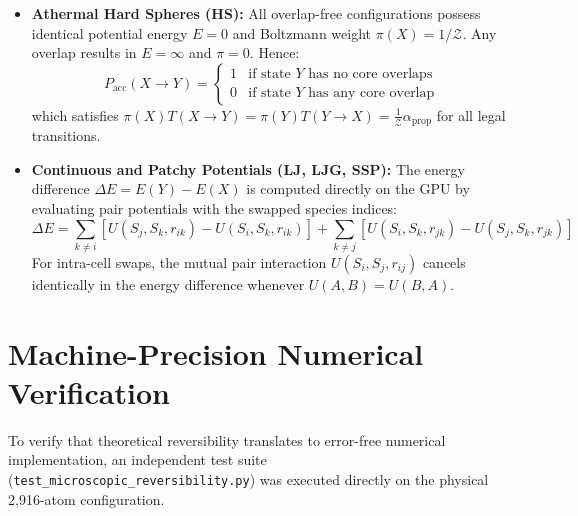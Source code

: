 \documentclass[11pt,a4paper]{article}
\begin{document}
\begin{itemize}
    \item \textbf{Athermal Hard Spheres (HS):} All overlap-free configurations possess identical potential energy $E = 0$ and Boltzmann weight $\pi(X) = 1/\mathcal{Z}$. Any overlap results in $E = \infty$ and $\pi = 0$. Hence:
    \begin{equation}
        P_{\text{acc}}(X \to Y) = \begin{cases} 1 & \text{if state } Y \text{ has no core overlaps} \\ 0 & \text{if state } Y \text{ has any core overlap} \end{cases}
    \end{equation}
    which satisfies $\pi(X) T(X \to Y) = \pi(Y) T(Y \to X) = \frac{1}{\mathcal{Z}} \alpha_{\text{prop}}$ for all legal transitions.
    \item \textbf{Continuous and Patchy Potentials (LJ, LJG, SSP):} The energy difference $\Delta E = E(Y) - E(X)$ is computed directly on the GPU by evaluating pair potentials with the swapped species indices:
    \begin{equation}
        \Delta E = \sum_{k \neq i} \left[ U(S_j, S_k, r_{ik}) - U(S_i, S_k, r_{ik}) \right] + \sum_{k \neq j} \left[ U(S_i, S_k, r_{jk}) - U(S_j, S_k, r_{jk}) \right]
    \end{equation}
    For intra-cell swaps, the mutual pair interaction $U(S_i, S_j, r_{ij})$ cancels identically in the energy difference whenever $U(A, B) = U(B, A)$.
\end{itemize}

\section{Machine-Precision Numerical Verification}

To verify that theoretical reversibility translates to error-free numerical implementation, an independent test suite (\texttt{test\_microscopic\_reversibility.py}) was executed directly on the physical 2,916-atom configuration.
\end{document}
